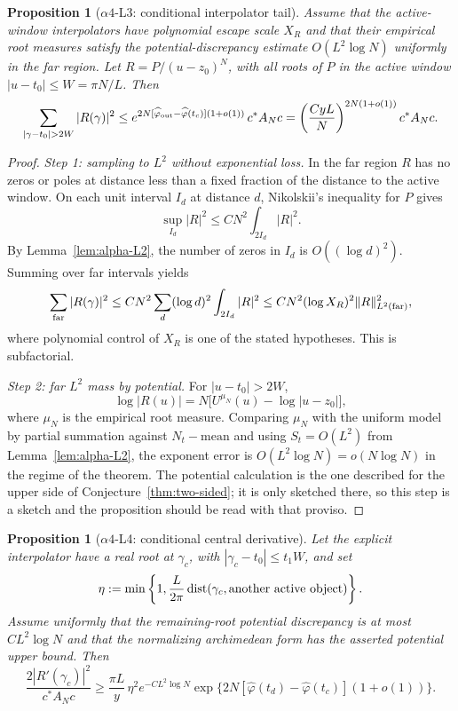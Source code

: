 \documentclass[11pt]{amsart}
\newtheorem{proposition}[theorem]{Proposition}
\theoremstyle{definition}
\theoremstyle{remark}
\theoremstyle{definition}
\begin{document}
\begin{proposition}[$\alpha4$-L3: conditional interpolator tail]\label{lem:alpha-L3}\label{lem:alpha-L3-full}
Assume that the active-window interpolators have polynomial escape scale $X_R$ and that their empirical
root measures satisfy the potential-discrepancy estimate $O(L^2\log N)$ uniformly in the far region.
Let $R=P/(u-z_0)^N$, with all roots of $P$ in the active window
$|u-t_0|\le W=\pi N/L$.  Then
\[
   \sum_{|\gamma-t_0|>2W}|R(\gamma)|^2
   \le
   e^{2N[\widehat\varphi_{\rm out}-\widehat\varphi(t_c)](1+o(1))}\,c^*A_Nc
   =
   \left(\frac{CyL}{N}\right)^{2N(1+o(1))}c^*A_Nc.
\]
\end{proposition}

\begin{proof}
\emph{Step 1: sampling to $L^2$ without exponential loss.}  In the far region $R$ has no zeros or
poles at distance less than a fixed fraction of the distance to the active window.  On each unit
interval $I_d$ at distance $d$, Nikolskii's inequality for $P$ gives
\[
   \sup_{I_d}|R|^2\le C N^2\int_{2I_d}|R|^2.
\]
By Lemma~\ref{lem:alpha-L2}, the number of zeros in $I_d$ is $O((\log d)^2)$.  Summing over far
intervals yields
\[
   \sum_{\rm far}|R(\gamma)|^2
   \le
   C N^2\sum_d(\log d)^2\int_{2I_d}|R|^2
   \le
   C N^2(\log X_R)^2\|R\|^2_{L^2({\rm far})},
\]
where polynomial control of $X_R$ is one of the stated hypotheses.  This is subfactorial.

\emph{Step 2: far $L^2$ mass by potential.}  For $|u-t_0|>2W$,
\[
   \log|R(u)|=N\bigl[U^{\mu_N}(u)-\log|u-z_0|\bigr],
\]
where $\mu_N$ is the empirical root measure.  Comparing $\mu_N$ with the uniform model by partial
summation against $N_t-\mathrm{mean}$ and using $S_t=O(L^2)$ from Lemma~\ref{lem:alpha-L2}, the exponent
error is $O(L^2\log N)=o(N\log N)$ in the regime of the theorem.  The potential calculation is the one described for the
upper side of Conjecture~\ref{thm:two-sided}; it is only sketched there, so this step is a sketch and the
proposition should be read with that proviso.
\end{proof}

\begin{proposition}[$\alpha4$-L4: conditional central derivative]\label{lem:alpha-L4}\label{lem:alpha-L4-full}
Let the explicit interpolator have a real root at $\gamma_c$, with
$|\gamma_c-t_0|\le t_1W$, and set
\[
   \eta:=\min\left\{1,\frac{L}{2\pi}\operatorname{dist}(\gamma_c,\textnormal{another active object})\right\}.
\]
Assume uniformly that the remaining-root potential discrepancy is at most $CL^2\log N$ and that the
normalizing archimedean form has the asserted potential upper bound.  Then
\[
   \frac{2|R'(\gamma_c)|^2}{c^*A_Nc}
   \ge
   \frac{\pi L}{y}\,\eta^2 e^{-C L^2\log N}
   \exp\{2N[\widehat\varphi(t_d)-\widehat\varphi(t_c)](1+o(1))\}.
\]
\end{proposition}
\end{document}
